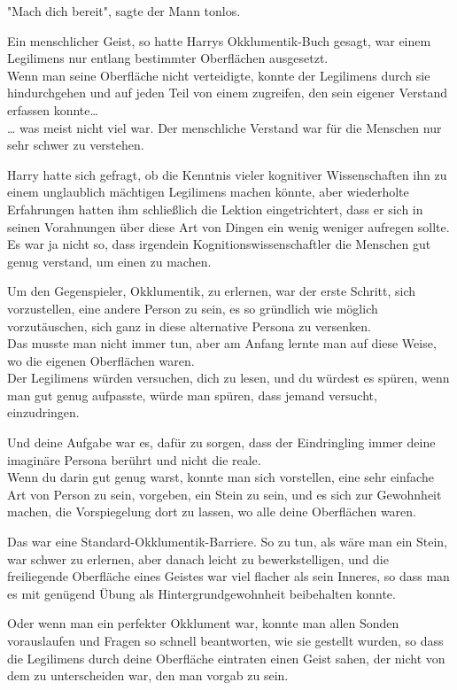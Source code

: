 {"Mach dich bereit", sagte der Mann tonlos.

Ein menschlicher Geist, so hatte Harrys Okklumentik-Buch gesagt, war einem Legilimens nur entlang bestimmter Oberflächen ausgesetzt.\\ Wenn man seine Oberfläche nicht verteidigte, konnte der Legilimens durch sie hindurchgehen und auf jeden Teil von einem zugreifen, den sein eigener Verstand erfassen konnte…\\ … was meist nicht viel war. Der menschliche Verstand war für die Menschen nur sehr schwer zu verstehen.

Harry hatte sich gefragt, ob die Kenntnis vieler kognitiver Wissenschaften ihn zu einem unglaublich mächtigen Legilimens machen könnte, aber wiederholte Erfahrungen hatten ihm schließlich die Lektion eingetrichtert, dass er sich in seinen Vorahnungen über diese Art von Dingen ein wenig weniger aufregen sollte.\\ Es war ja nicht so, dass irgendein Kognitionswissenschaftler die Menschen gut genug verstand, um einen zu machen.

Um den Gegenspieler, Okklumentik, zu erlernen, war der erste Schritt, sich vorzustellen, eine andere Person zu sein, es so gründlich wie möglich vorzutäuschen, sich ganz in diese alternative Persona zu versenken.\\ Das musste man nicht immer tun, aber am Anfang lernte man auf diese Weise, wo die eigenen Oberflächen waren.\\ Der Legilimens würden versuchen, dich zu lesen, und du würdest es spüren, wenn man gut genug aufpasste, würde man spüren, dass jemand versucht, einzudringen.

Und deine Aufgabe war es, dafür zu sorgen, dass der Eindringling immer deine imaginäre Persona berührt und nicht die reale.\\ Wenn du darin gut genug warst, konnte man sich vorstellen, eine sehr einfache Art von Person zu sein, vorgeben, ein Stein zu sein, und es sich zur Gewohnheit machen, die Vorspiegelung dort zu lassen, wo alle deine Oberflächen waren.

Das war eine Standard-Okklumentik-Barriere. So zu tun, als wäre man ein Stein, war schwer zu erlernen, aber danach leicht zu bewerkstelligen, und die freiliegende Oberfläche eines Geistes war viel flacher als sein Inneres, so dass man es mit genügend Übung als Hintergrundgewohnheit beibehalten konnte.

Oder wenn man ein perfekter Okklument war, konnte man allen Sonden vorauslaufen und Fragen so schnell beantworten, wie sie gestellt wurden, so dass die Legilimens durch deine Oberfläche eintraten einen Geist sahen, der nicht von dem zu unterscheiden war, den man vorgab zu sein.

}
